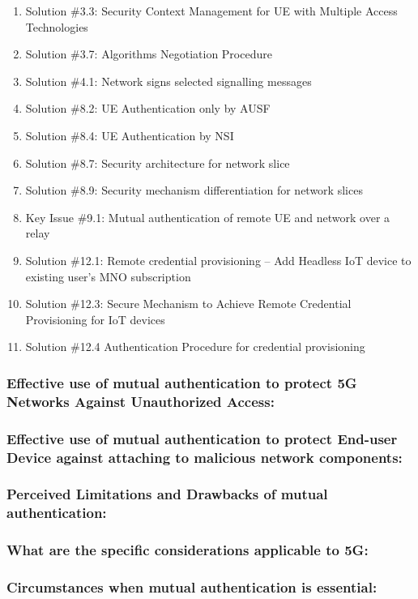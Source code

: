 \documentclass[lnicst,sechang,a4paper]{svmultln}
\begin{document}
\begin{enumerate}
\item Solution \#3.3: Security Context Management for UE with Multiple Access Technologies
\item Solution \#3.7: Algorithms Negotiation Procedure
\item Solution \#4.1: Network signs selected signalling messages
\item Solution \#8.2: UE Authentication only by AUSF
\item Solution \#8.4: UE Authentication by NSI
\item Solution \#8.7: Security architecture for network slice
\item Solution \#8.9: Security mechanism differentiation for network slices
\item Key Issue \#9.1: Mutual authentication of remote UE and network over a relay
\item Solution \#12.1: Remote credential provisioning – Add Headless IoT device to existing user’s MNO subscription
\item Solution \#12.3: Secure Mechanism to Achieve Remote Credential Provisioning for IoT devices
\item Solution \#12.4 Authentication Procedure for credential provisioning

\end{enumerate}


\subsubsection{Effective use of mutual authentication to protect 5G Networks Against Unauthorized Access:}
\subsubsection{Effective use of mutual authentication to protect End-user Device against attaching to malicious network components:}
\subsubsection{Perceived Limitations and Drawbacks of mutual authentication:}
\subsubsection{What are the specific considerations applicable to 5G:}
\subsubsection{Circumstances when mutual authentication is essential:}
\end{document}
